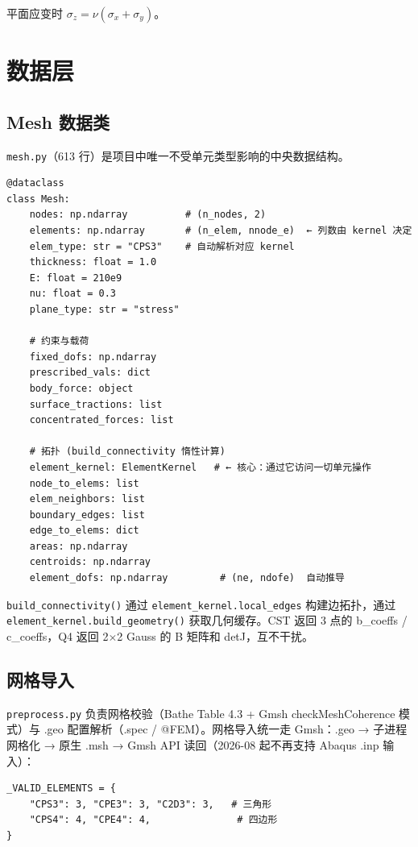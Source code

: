 \documentclass[12pt,a4paper]{ctexart}
\begin{document}
平面应变时 $\sigma_z = \nu(\sigma_x+\sigma_y)$。

\section{数据层}

\subsection{Mesh 数据类}

\texttt{mesh.py}（613 行）是项目中唯一不受单元类型影响的中央数据结构。

\begin{lstlisting}
@dataclass
class Mesh:
    nodes: np.ndarray          # (n_nodes, 2)
    elements: np.ndarray       # (n_elem, nnode_e)  ← 列数由 kernel 决定
    elem_type: str = "CPS3"    # 自动解析对应 kernel
    thickness: float = 1.0
    E: float = 210e9
    nu: float = 0.3
    plane_type: str = "stress"

    # 约束与载荷
    fixed_dofs: np.ndarray
    prescribed_vals: dict
    body_force: object
    surface_tractions: list
    concentrated_forces: list

    # 拓扑 (build_connectivity 惰性计算)
    element_kernel: ElementKernel   # ← 核心：通过它访问一切单元操作
    node_to_elems: list
    elem_neighbors: list
    boundary_edges: list
    edge_to_elems: dict
    areas: np.ndarray
    centroids: np.ndarray
    element_dofs: np.ndarray         # (ne, ndofe)  自动推导
\end{lstlisting}

\texttt{build\_connectivity()} 通过 \texttt{element\_kernel.local\_edges} 构建边拓扑，通过 \texttt{element\_kernel.build\_geometry()} 获取几何缓存。CST 返回 3 点的 b\_coeffs / c\_coeffs，Q4 返回 2$\times$2 Gauss 的 B 矩阵和 detJ，互不干扰。

\subsection{网格导入}

\texttt{preprocess.py} 负责网格校验（Bathe Table 4.3 + Gmsh checkMeshCoherence 模式）与 .geo 配置解析（.spec / @FEM）。网格导入统一走 Gmsh：.geo → 子进程网格化 → 原生 .msh → Gmsh API 读回（2026-08 起不再支持 Abaqus .inp 输入）：

\begin{lstlisting}
_VALID_ELEMENTS = {
    "CPS3": 3, "CPE3": 3, "C2D3": 3,   # 三角形
    "CPS4": 4, "CPE4": 4,               # 四边形
}
\end{lstlisting}
\end{document}
